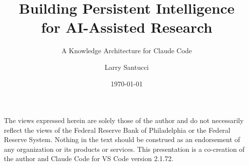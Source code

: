 \documentclass[aspectratio=169,11pt]{beamer}
\title[Knowledge Architecture]{Building Persistent Intelligence\\for AI-Assisted Research}
\subtitle{A Knowledge Architecture for Claude Code}
\author[L.\ Santucci]{Larry Santucci}
\institute{Federal Reserve Bank of Philadelphia}
\date{\today}
\begin{document}
\begin{frame}[plain]
\titlepage
\vspace{-6pt}
{\centering\scriptsize\color{cGray}%
The views expressed herein are solely those of the author and do not necessarily reflect the views of the Federal Reserve Bank of Philadelphia or the Federal Reserve System. Nothing in the text should be construed as an endorsement of any organization or its products or services. This presentation is a co-creation of the author and Claude Code for VS Code version 2.1.72.\par}
\end{frame}

\end{document}
